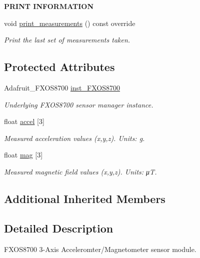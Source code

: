 \begin{Indent}{\bf P\+R\+I\+NT I\+N\+F\+O\+R\+M\+A\+T\+I\+ON}\par
\begin{DoxyCompactItemize}
\item 
void \hyperlink{class_loom___f_x_o_s8700_a5f0278c72703e052a5abc0c84770c585}{print\+\_\+measurements} () const override
\begin{DoxyCompactList}\small\item\em Print the last set of measurements taken. \end{DoxyCompactList}\end{DoxyCompactItemize}
\end{Indent}
\subsection*{Protected Attributes}
\begin{DoxyCompactItemize}
\item 
Adafruit\+\_\+\+F\+X\+O\+S8700 \hyperlink{class_loom___f_x_o_s8700_ad3ff453ce86ac6fb61d8109b89877f7b}{inst\+\_\+\+F\+X\+O\+S8700}
\begin{DoxyCompactList}\small\item\em Underlying F\+X\+O\+S8700 sensor manager instance. \end{DoxyCompactList}\item 
float \hyperlink{class_loom___f_x_o_s8700_aadfab4b0fa7df60dceffd2242494a457}{accel} \mbox{[}3\mbox{]}
\begin{DoxyCompactList}\small\item\em Measured acceleration values (x,y,z). Units\+: g. \end{DoxyCompactList}\item 
float \hyperlink{class_loom___f_x_o_s8700_af4ac468c842d26be3d1ef3ed3a67644f}{mag} \mbox{[}3\mbox{]}
\begin{DoxyCompactList}\small\item\em Measured magnetic field values (x,y,z). Units\+: μT. \end{DoxyCompactList}\end{DoxyCompactItemize}
\subsection*{Additional Inherited Members}


\subsection{Detailed Description}
F\+X\+O\+S8700 3-\/\+Axis Acceleromter/\+Magnetometer sensor module. 

